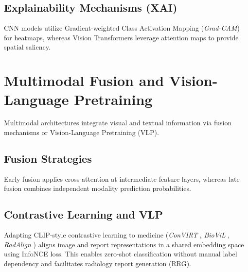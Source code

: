 \subsection{Explainability Mechanisms (XAI)}
CNN models utilize Gradient-weighted Class Activation Mapping (\textit{Grad-CAM}) for heatmaps, whereas Vision Transformers leverage attention maps to provide spatial saliency.

\section{Multimodal Fusion and Vision-Language Pretraining}
Multimodal architectures integrate visual and textual information via fusion mechanisms or Vision-Language Pretraining (VLP).

\subsection{Fusion Strategies}
Early fusion applies cross-attention at intermediate feature layers, whereas late fusion combines independent modality prediction probabilities.

\subsection{Contrastive Learning and VLP}
Adapting CLIP-style contrastive learning to medicine (\textit{ConVIRT} \cite{zhang2022contrastive}, \textit{BioViL} \cite{boecking2022making}, \textit{RadAlign} \cite{radalign2025advancing}) aligns image and report representations in a shared embedding space using InfoNCE loss. This enables zero-shot classification without manual label dependency and facilitates radiology report generation (RRG).
